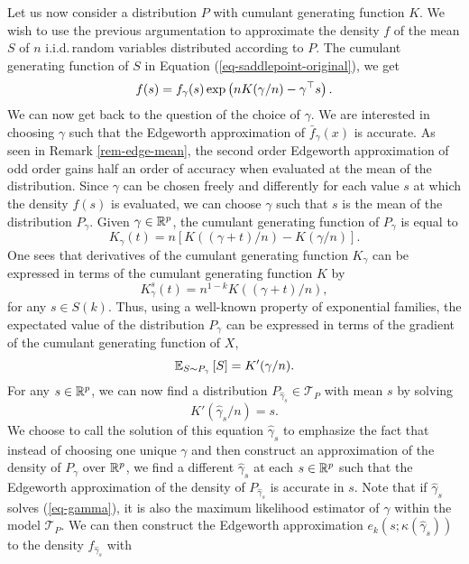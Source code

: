 Let us now consider a distribution $P$ with cumulant generating function $K$. We wish to use the previous argumentation to approximate the density $f$ of the mean $S$ of $n$ i.i.d.\,random variables distributed according to $P$. The cumulant generating function of $S$ in Equation (\ref{eq-saddlepoint-original}), we get
\begin{equation*}
    f(s) = f_\gamma(s)\exp\left(nK(\gamma / n) - \gamma^\top s\right).
\end{equation*}
We can now get back to the question of the choice of $\gamma$. We are interested in choosing $\gamma$ such that the Edgeworth approximation of $\bar f_\gamma(x)$ is accurate. As seen in Remark \ref{rem-edge-mean}, the second order Edgeworth approximation of odd order gains half an order of accuracy when evaluated at the mean of the distribution. Since $\gamma$ can be chosen freely and differently for each value $s$ at which the density $f(s)$ is evaluated, we can choose $\gamma$ such that $s$ is the mean of the distribution $P_\gamma$. Given $\gamma \in {\mathbb{R}^p}$, the cumulant generating function of $P_\gamma$ is equal to
\begin{equation*}
    K_\gamma(t) = n\left[K((\gamma + t)/n) - K(\gamma/n)\right].
\end{equation*}
One sees that derivatives of the cumulant generating function $K_\gamma$ can be expressed in terms of the cumulant generating function $K$ by
\begin{equation} \label{eq-deriv-Kgamma}
    K_\gamma^s(t) = n^{1 - k} K((\gamma + t) / n),
\end{equation}
for any $s \in S(k)$. Thus, using a well-known property of exponential families, the expectated value of the distribution $P_\gamma$ can be expressed in terms of the gradient of the cumulant generating function of $X$,
\begin{equation*}
    \mathbb{E}_{S \sim P_\gamma}\left[S\right] = K'(\gamma / n).
\end{equation*}
For any $s \in {\mathbb{R}^p}$, we can now find a distribution $P_{\hat\gamma_s} \in \mathcal{T}_P$ with mean $s$ by solving
\begin{equation} \label{eq-gamma}
    K'(\hat\gamma_s / n) = s.
\end{equation}
We choose to call the solution of this equation $\hat\gamma_s$ to emphasize the fact that instead of choosing one unique $\gamma$ and then construct an approximation of the density of $P_\gamma$ over ${\mathbb{R}^p}$, we find a different $\hat\gamma_s$ at each $s \in {\mathbb{R}^p}$ such that the Edgeworth approximation of the density of $P_{\hat\gamma_s}$ is accurate in $s$. Note that if $\hat\gamma_s$ solves (\ref{eq-gamma}), it is also the maximum likelihood estimator of $\gamma$ within the model $\mathcal{T}_P$. We can then construct the Edgeworth approximation $e_k(s; \kappa(\hat\gamma_s))$ to the density $f_{\hat\gamma_s}$ with

